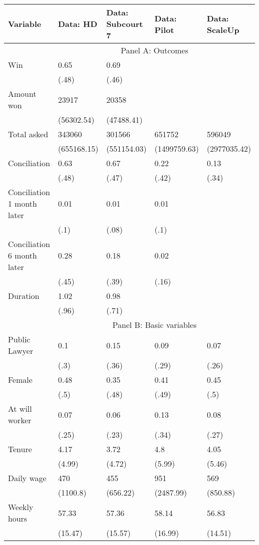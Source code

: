 \begin{tabular}{lllll}
\toprule
Variable & Data: HD & Data: Subcourt 7 & Data: Pilot & Data: ScaleUp \\
\midrule
\midrule
      & \multicolumn{4}{c}{Panel A: Outcomes} \\
\cmidrule{2-5}Win   & 0.65  & 0.69  &       &  \\
      & (.48) & (.46) &       &  \\
Amount won & 23917 & 20358 &       &  \\
      & (56302.54) & (47488.41) &       &  \\
Total asked & 343060 & 301566 & 651752 & 596049 \\
      & (655168.15) & (551154.03) & (1499759.63) & (2977035.42) \\
Conciliation  & 0.63  & 0.67  & 0.22  & 0.13 \\
      & (.48) & (.47) & (.42) & (.34) \\
Conciliation 1 month later & 0.01  & 0.01  & 0.01  &  \\
      & (.1)  & (.08) & (.1)  &  \\
Conciliation 6 month later & 0.28  & 0.18  & 0.02  &  \\
      & (.45) & (.39) & (.16) &  \\
Duration & 1.02  & 0.98  &       &  \\
      & (.96) & (.71) &       &  \\
\cmidrule{2-5}      & \multicolumn{4}{c}{Panel B: Basic variables} \\
\cmidrule{2-5}Public Lawyer & 0.1   & 0.15  & 0.09  & 0.07 \\
      & (.3)  & (.36) & (.29) & (.26) \\
Female & 0.48  & 0.35  & 0.41  & 0.45 \\
      & (.5)  & (.48) & (.49) & (.5) \\
At will worker & 0.07  & 0.06  & 0.13  & 0.08 \\
      & (.25) & (.23) & (.34) & (.27) \\
Tenure & 4.17  & 3.72  & 4.8   & 4.05 \\
      & (4.99) & (4.72) & (5.99) & (5.46) \\
Daily wage & 470   & 455   & 951   & 569 \\
      & (1100.8) & (656.22) & (2487.99) & (850.88) \\
Weekly hours & 57.33 & 57.36 & 58.14 & 56.83 \\
      & (15.47) & (15.57) & (16.99) & (14.51) \\

\end{tabular}
